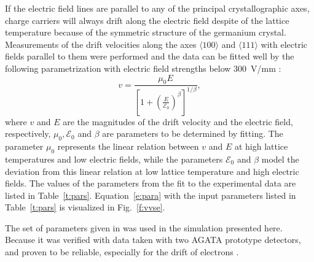 \documentclass[epj]{svjour}
\begin{document}
If the electric field lines are parallel to any of the principal
crystallographic axes, charge carriers will always drift along the
electric field despite of the lattice temperature because of the
symmetric structure of the germanium crystal. Measurements of the
drift velocities along the axes $\langle 100 \rangle$ and $\langle 111
\rangle$ with electric fields parallel to them were performed
\cite{miha,reg,bart} and the data can be fitted well by the following
parametrization \cite{Kno99} with electric field strengths below
300~V/mm \cite{miha}:
\begin{equation} 
\label{e:para} 
v = \frac{\mu_{0}E}{[1+(\frac{E}{\mathcal{E}_{0}})^{\beta}]^{1/\beta}}, 
\end{equation} 
where $v$ and $E$ are the magnitudes of the drift velocity and the
electric field, respectively, $\mu_{0},\mathcal{E}_{0}$ and $\beta$
are parameters to be determined by fitting. The parameter $\mu_{0}$
represents the linear relation between $v$ and $E$ at high lattice
temperatures and low electric fields, while the parameters
$\mathcal{E}_{0}$ and $\beta$ model the deviation from this linear
relation at low lattice temperature and high electric fields. The
values of the parameters from the fit to the experimental data are
listed in Table~\ref{t:pars}. Equation~\ref{e:para} with the input
parameters listed in Table~\ref{t:pars} is visualized in
Fig.~\ref{f:vvse}.

The set of parameters given in \cite{bart} was used in the simulation
presented here. Because it was verified with data taken with two AGATA
\cite{agata} prototype detectors, and proven to be reliable,
especially for the drift of electrons \cite{bart2}.
 
\end{document}
